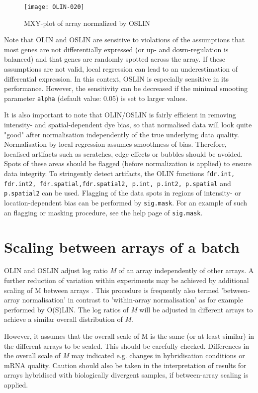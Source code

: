 \documentclass[a4paper,11pt]{article}
\begin{document}


\begin{figure}[t]
\centering
\texttt{[image: OLIN-020]}
\caption{MXY-plot of array normalized by  OSLIN }
\label{mxyoslin}
\end{figure}

Note that OLIN and OSLIN
are sensitive to violations of the assumptions that
 most genes are not differentially expressed (or up- and down-regulation
is balanced) and that genes are randomly spotted across the array. 
If these assumptions are not valid, local
regression can lead to an underestimation of differential expression.  
In this context,  OSLIN is especially sensitive in its performance. However, the
sensitivity can be decreased if the minimal smooting parameter \texttt{alpha} (default value: 0.05)
 is set to larger values. 
 

It is also important to note that OLIN/OSLIN is fairly efficient in removing intensity- and spatial-dependent dye bias, so that normalised  data will look quite "good" after normalisation independently of the true underlying data quality. Normalisation by local regression assumes smoothness of bias. Therefore, localised artifacts such as scratches, edge effects or bubbles should be avoided. Spots of these areas should be flagged (before normalization is applied) to ensure data integrity. To stringently detect artifacts, the OLIN functions \texttt{fdr.int, fdr.int2, fdr.spatial,fdr.spatial2, 
p.int, p.int2, p.spatial} and \texttt{p.spatial2} can be used. 
Flagging of the data spots in regions of intensity- or location-dependent bias can be performed 
by \texttt{sig.mask}. For an example of such an flagging or masking procedure, 
see the help page of \texttt{sig.mask}.


\section{Scaling between arrays of a batch}
OLIN and OSLIN adjust log ratio \emph{M} of an array independently of other arrays.
A further reduction  of variation within experiments may be achieved by
additional scaling of M between arrays \cite{yang}. This procedure is frequently
also termed 'between-array normalisation' in contrast to 'within-array normalisation'
as for example performed by O(S)LIN. The log ratios of \emph{M} will be adjusted in different
arrays to achieve a similar overall distribution of \emph{M}.

However, it assumes that the overall scale of M is the same (or at least similar)
in the different arrays to be scaled. This should be  carefully checked. Differences in the 
overall scale of \emph{M} may indicated e.g. changes in hybridisation conditions or mRNA quality.
Caution should also be taken in the interpretation of results for arrays
hybridised with  biologically divergent samples, if between-array  scaling is applied.
\end{document}
